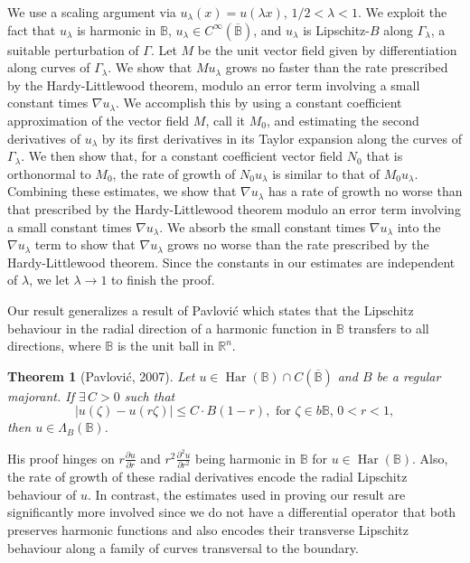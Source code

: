 \documentclass[12pt,a4paper]{amsart}
\numberwithin{equation}{section}
\newtheorem*{thmnonum}{Theorem}
\theoremstyle{definition}
\begin{document}
We use a scaling 
argument via $u_\lambda(x)=u(\lambda x)$, $1/2 < \lambda < 1$. We exploit the fact that $u_\lambda$ is harmonic in $\mathbb{B}$, $u_\lambda\in C^\infty\left(\overline{\mathbb{B}}\right)$, and $u_\lambda$ is 
Lipschitz-$B$ along $\Gamma_\lambda$, a suitable perturbation of $\Gamma$. Let $M$ be the unit vector field given by differentiation along curves of $\Gamma_\lambda$. We show that $Mu_\lambda$ grows
no faster than the rate prescribed by the Hardy-Littlewood theorem, modulo an error term involving a small constant times $\nabla u_\lambda$. We accomplish this by using a constant 
coefficient approximation of the vector field $M$, call it $M_0$,  and estimating the second derivatives of $u_\lambda$ by its first derivatives in its Taylor expansion along the curves of 
$\Gamma_\lambda$. We then show that, for a constant coefficient vector field $N_0$ that is orthonormal to $M_0$, the rate of growth of $N_0u_\lambda$ is similar to that of $M_0u_\lambda$. Combining these 
estimates, we show that $\nabla u_\lambda$ has a rate of growth no worse than that prescribed by the Hardy-Littlewood theorem modulo an error term involving a small constant times $\nabla u_\lambda$. We 
absorb the small constant times $\nabla u_\lambda$ into the $\nabla u_\lambda$ term to show that $\nabla u_\lambda$ grows no worse than the rate prescribed by the Hardy-Littlewood theorem. Since the 
constants in our estimates are independent of $\lambda$, we let $\lambda \to 1$ to finish the proof.

Our result generalizes a result of Pavlovi\'{c} \cite{Pav07-LipHarmonic} which states that the Lipschitz behaviour in the radial direction of a harmonic function in $\mathbb{B}$ transfers to all directions, where $\mathbb{B}$ is the unit ball in $\mathbb{R}^n$. 
\begin{thmnonum}[Pavlovi\'{c}, 2007] Let $u\in\operatorname{\operatorname{Har}}(\mathbb{B}) \cap C(\overline{\mathbb{B}})$ and $B$ be a regular majorant. If $\exists\, C>0$  such that 
\[{\left\lvert{u(\zeta)-u(r\zeta)}\right\rvert} \le C\cdot B(1-r), \text{ for } \zeta\in b\mathbb{B}\text{, } 0<r<1,\]
then $u\in\Lambda_B(\mathbb{B})$.
\end{thmnonum}
His proof hinges on $r\frac{\partial u}{\partial r}$ and $r^2\frac{\partial^2 u}{\partial r^2}$ being harmonic in $\mathbb{B}$ for $u\in\operatorname{\operatorname{Har}}(\mathbb{B})$. Also, the rate of growth of these radial derivatives encode the 
radial Lipschitz behaviour of $u$. In contrast, the estimates used in proving our result are significantly more involved since we do not have a differential operator that both preserves harmonic functions and also 
encodes their transverse Lipschitz behaviour along a family of curves transversal to the boundary.
\end{document}
